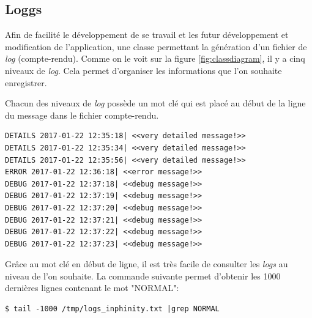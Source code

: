\subsection{Loggs}
Afin de facilité le développement de se travail et les futur développement et modification de l'application, une classe permettant la génération d'un fichier de \emph{log} (compte-rendu). Comme on le voit sur la figure \ref{fig:classdiagram}, il y a cinq niveaux de \emph{log}. Cela permet d'organiser les informations que l'on souhaite enregistrer.

Chacun des niveaux de \emph{log} possède un mot clé qui est placé au début de la ligne du message dans le fichier compte-rendu.

\lstset{language=bash}
\begin{lstlisting}[frame=single]
DETAILS 2017-01-22 12:35:18| <<very detailed message!>>
DETAILS 2017-01-22 12:35:34| <<very detailed message!>>
DETAILS 2017-01-22 12:35:56| <<very detailed message!>>
ERROR 2017-01-22 12:36:18| <<error message!>>
DEBUG 2017-01-22 12:37:18| <<debug message!>>
DEBUG 2017-01-22 12:37:19| <<debug message!>>
DEBUG 2017-01-22 12:37:20| <<debug message!>>
DEBUG 2017-01-22 12:37:21| <<debug message!>>
DEBUG 2017-01-22 12:37:22| <<debug message!>>
DEBUG 2017-01-22 12:37:23| <<debug message!>>
\end{lstlisting}

Grâce au mot clé en début de ligne, il est très facile de consulter les \emph{logs} au niveau de l'on souhaite. La commande suivante permet d'obtenir les 1000 dernières lignes contenant le mot "NORMAL":

\begin{lstlisting}[frame=single]
$ tail -1000 /tmp/logs_inphinity.txt |grep NORMAL
\end{lstlisting}













































